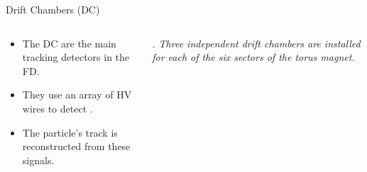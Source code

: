 \begin{frame}{Drift Chambers (DC)}
    \label{10.33::dc}

    \begin{columns}[onlytextwidth,T]

    \begin{column}{.43\linewidth}
        \vspace{36pt}
        \begin{itemize}
            \item
                The DC are the main tracking detectors in the FD.

            \vspace{12pt}
            \item
                They use an array of HV wires to detect .

            \vspace{12pt}
            \item
                The particle's track is reconstructed from these signals.
        \end{itemize}
    \end{column}

    \begin{column}{.55\linewidth}
        \vspace{-12pt}
        \begin{figure}[t]
        \end{figure}
        \vspace{-21pt}
        \scriptsize{\textit{
            .
            Three independent drift chambers are installed for each of the six sectors of the torus magnet.
        }}


\end{column}
\end{columns}
\end{frame}

